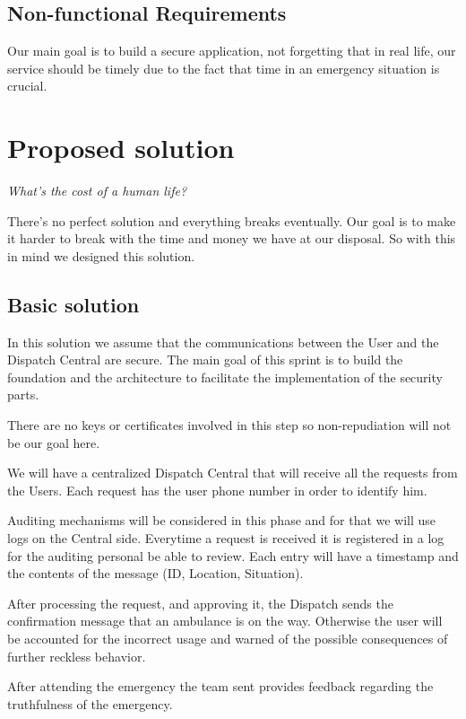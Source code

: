 \documentclass[a4paper,titlepage,11pt]{article}
\begin{document}
\subsection{Non-functional Requirements}
Our main goal is to build a secure application, not forgetting that in real life,
our service should be timely due to the fact that time in an emergency situation is crucial.

\section{Proposed solution}

\begin{center}
  \textit{What's the cost of a human life?}
\end{center}

There's no perfect solution and everything breaks eventually.
Our goal is to make it harder to break with the time and money we have at our disposal.
So with this in mind we designed this solution.

\subsection{Basic solution}
In this solution we assume that the communications between the User and the Dispatch Central are secure.
The main goal of this sprint is to build the foundation and the architecture to facilitate the implementation of the security parts.

There are no keys or certificates involved in this step so non-repudiation will not be our goal here.

We will have a centralized Dispatch Central that will receive all the requests from the Users.
Each request has the user phone number in order to identify him.

Auditing mechanisms will be considered in this phase and for that we will use logs on the Central side.
Everytime a request is received it is registered in a log for the auditing personal be able to review.
Each entry will have a timestamp and the contents of the message (ID, Location, Situation).

After processing the request, and approving it, the Dispatch sends the confirmation message that an ambulance is on the way.
Otherwise the user will be accounted for the incorrect usage and warned of the possible consequences of further reckless behavior.

After attending the emergency the team sent provides feedback regarding the truthfulness of the emergency.
\end{document}

